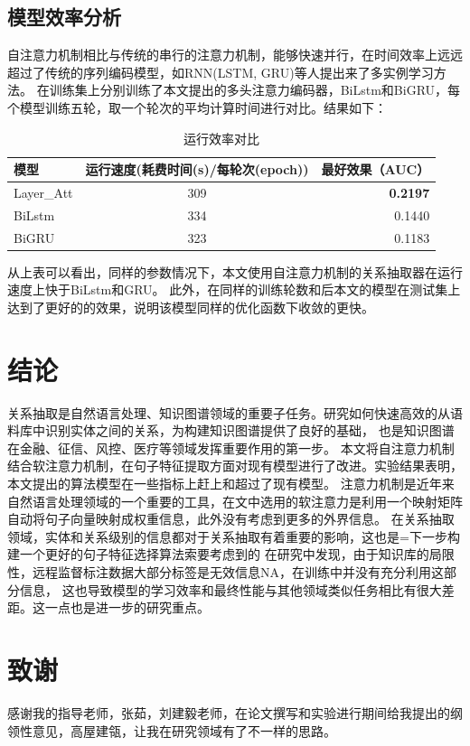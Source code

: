 \documentclass[UTF8]{csoarticle}
\begin{document}
\subsection{模型效率分析}
自注意力机制相比与传统的串行的注意力机制，能够快速并行，在时间效率上远远超过了传统的序列编码模型，如RNN(LSTM, GRU)等人提出来了多实例学习方法。
在训练集上分别训练了本文提出的多头注意力编码器，BiLstm和BiGRU，每个模型训练五轮，取一个轮次的平均计算时间进行对比。结果如下：

\begin{table}[!htbp]
\begin{center}
    \begin{tabular}{|l|c|r|}
    模型 & 运行速度(耗费时间(s)/每轮次(epoch)) & 最好效果（AUC）\\
    \hline  
    Layer\_Att &309 & \textbf{0.2197}  \\
    BiLstm & 334& 0.1440\\
    BiGRU & 323& 0.1183\\
    \end{tabular}
    \caption{运行效率对比}
\end{center}

\end{table}

从上表可以看出，同样的参数情况下，本文使用自注意力机制的关系抽取器在运行速度上快于BiLstm和GRU。
此外，在同样的训练轮数和后本文的模型在测试集上达到了更好的的效果，说明该模型同样的优化函数下收敛的更快。

\section{结论}
关系抽取是自然语言处理、知识图谱领域的重要子任务。研究如何快速高效的从语料库中识别实体之间的关系，为构建知识图谱提供了良好的基础，
也是知识图谱在金融、征信、风控、医疗等领域发挥重要作用的第一步。
本文将自注意力机制结合软注意力机制，在句子特征提取方面对现有模型进行了改进。实验结果表明，本文提出的算法模型在一些指标上赶上和超过了现有模型。
注意力机制是近年来自然语言处理领域的一个重要的工具，在文中选用的软注意力是利用一个映射矩阵自动将句子向量映射成权重信息，此外没有考虑到更多的外界信息。
在关系抽取领域，实体和关系级别的信息都对于关系抽取有着重要的影响，这也是=下一步构建一个更好的句子特征选择算法索要考虑到的
在研究中发现，由于知识库的局限性，远程监督标注数据大部分标签是无效信息NA，在训练中并没有充分利用这部分信息，
这也导致模型的学习效率和最终性能与其他领域类似任务相比有很大差距。这一点也是进一步的研究重点。
\section*{致谢}
感谢我的指导老师，张茹，刘建毅老师，在论文撰写和实验进行期间给我提出的纲领性意见，高屋建瓴，让我在研究领域有了不一样的思路。
\end{document}

